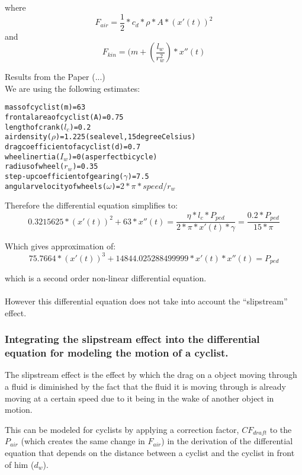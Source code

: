 \documentclass[10pt, a4paper]{report}
\begin{document}
where $$ F_{air} 	= \frac{1}{2} * c_{d} * \rho * A * ( x'(t) )^{2} $$
and	  $$ F_{kin} 	= ( m + ( \frac{l_w}{r_w^{2}} ) * x''(t) $$

Results from the Paper (...)\\

We are using the following estimates:

\begin{alltt}
mass of cyclist (m) 				= 63
frontal area of cyclist (A) 		= 0.75
length of crank (\(l_{c}\)) 		= 0.2
air density (\(\rho\)) 				= 1.225 (sea level, 15 degree Celsius)
drag coefficient of a cyclist (d) 	= 0.7
wheel inertia (\(I_w\)) = 0 (as perfect bicycle)
radius of wheel (\(r_w\)) = 0.35
step-up coefficient of gearing (\(\gamma\)) = 7.5
angular velocity of wheels (\(\omega\)) = \(2 * \pi * speed / {r_{w}} \)
\end{alltt}

Therefore the differential equation simplifies to:
$$ 0.3215625 * (x'(t))^{2} + 63 * x''(t)
	= \frac{\eta * l_{c} * P_{ped}} {2 * \pi * x'(t) * \gamma }
	= \frac {0.2 * P_{ped}} {15 * \pi} $$

Which gives approximation of:
$$ 75.7664 *(x'(t))^{3} + 14844.025288499999 * x'(t) * x''(t) = P_{ped}$$

which is a second order non-linear differential equation.\\\\

However this differential equation does not take into account the ``slipstream'' effect.

\subsubsection{Integrating the slipstream effect into the differential equation for modeling the motion of a cyclist.}

The slipstream effect is the effect by which the drag on a object moving through a fluid is diminished by the fact that the fluid it is moving through is already moving at a certain speed due to it being in the wake of another object in motion. \newline \par

This can be modeled for cyclists by applying a correction factor, $CF_{draft}$ to the $P_{air}$ (which creates the same change in $F_{air}$) in the derivation of the differential equation that depends on the distance between a cyclist and the cyclist in front of him ($d_w$). \newline \par
\end{document}
